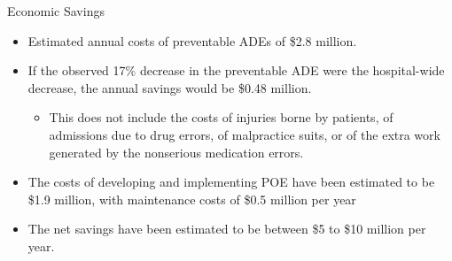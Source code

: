 \documentclass[10pt]{beamer}
\begin{document}
\begin{frame}{Economic Savings}
	\begin{itemize}
		\item Estimated annual costs of preventable ADEs of \$2.8 million. 
		\item If the observed 17\% decrease in the preventable ADE were the hospital-wide decrease, the annual savings would be \$0.48 million. 
		\begin{itemize}
			\item This does not include the costs of injuries borne by patients, of admissions due to drug errors, of malpractice suits, or of the extra work generated by the nonserious medication errors. 
		\end{itemize}
		\item The costs of developing and implementing POE have been estimated to be \$1.9 million, with maintenance costs of \$0.5 million per year
		\item The net savings have been estimated to be between \$5 to \$10 million per year.
	\end{itemize}
\end{frame}
\end{document}
